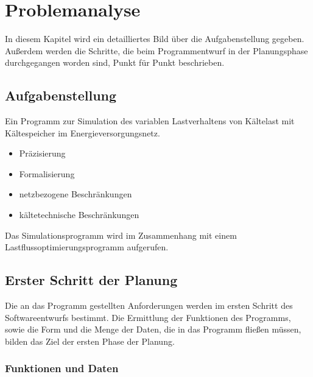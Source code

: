 \chapter{Problemanalyse}
\label{chap:problemanalyse}
\minitoc

In diesem Kapitel wird ein detailliertes Bild über die Aufgabenstellung gegeben.
Außerdem werden die Schritte, die beim Programmentwurf in der Planungsphase
durchgegangen worden sind, Punkt für Punkt beschrieben.

\section{Aufgabenstellung}

Ein Programm zur Simulation des variablen Lastverhaltens von Kältelast mit
Kältespeicher im Energieversorgungsnetz.

\begin{itemize}
	\item Präzisierung
	\item Formalisierung
\end{itemize}

\begin{itemize}
	\item netzbezogene Beschränkungen
	\item kältetechnische Beschränkungen
\end{itemize}

Das Simulationsprogramm wird im Zusammenhang mit einem
Lastflussoptimierungsprogramm aufgerufen.

\section{Erster Schritt der Planung}

Die an das Programm gestellten Anforderungen werden im ersten Schritt des
Softwareentwurfs bestimmt. Die Ermittlung der Funktionen des Programms, sowie
die Form und die Menge der Daten, die in das Programm fließen müssen, bilden das
Ziel der ersten Phase der Planung.

\subsection{Funktionen und Daten}


